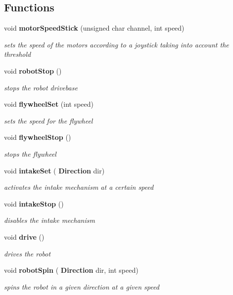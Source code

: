 \subsection*{Functions}
\begin{DoxyCompactItemize}
\item 
void \textbf{ motor\+Speed\+Stick} (unsigned char channel, int speed)
\begin{DoxyCompactList}\small\item\em sets the speed of the motors according to a joystick taking into account the threshold \end{DoxyCompactList}\item 
void \textbf{ robot\+Stop} ()
\begin{DoxyCompactList}\small\item\em stops the robot drivebase \end{DoxyCompactList}\item 
void \textbf{ flywheel\+Set} (int speed)
\begin{DoxyCompactList}\small\item\em sets the speed for the flywheel \end{DoxyCompactList}\item 
void \textbf{ flywheel\+Stop} ()
\begin{DoxyCompactList}\small\item\em stops the flywheel \end{DoxyCompactList}\item 
void \textbf{ intake\+Set} (\textbf{ Direction} dir)
\begin{DoxyCompactList}\small\item\em activates the intake mechanism at a certain speed \end{DoxyCompactList}\item 
void \textbf{ intake\+Stop} ()
\begin{DoxyCompactList}\small\item\em disables the intake mechanism \end{DoxyCompactList}\item 
void \textbf{ drive} ()
\begin{DoxyCompactList}\small\item\em drives the robot \end{DoxyCompactList}\item 
void \textbf{ robot\+Spin} (\textbf{ Direction} dir, int speed)
\begin{DoxyCompactList}\small\item\em spins the robot in a given direction at a given speed \end{DoxyCompactList}\item 

\end{DoxyCompactItemize}
